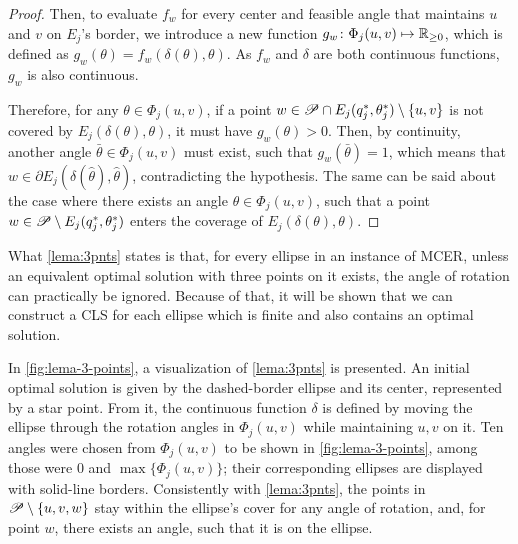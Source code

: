 \begin{proof}
	Then, to evaluate $f_w$ for every center and feasible angle that maintains $u$ and $v$ on $E_j$'s border, we introduce a new function $g_w\colon \Phi_j(u,v) \mapsto \mathbb{R}_{\ge0}$, which is defined as $g_w(\theta) = f_w(\delta(\theta), \theta)$.
	As $f_w$ and $\delta$ are both continuous functions, $g_w$ is also continuous.
	
	Therefore, for any $\theta\in\Phi_j(u,v)$, if a point $w \in \mathscr{P} \cap E_j(q_j^*, \theta_j^*)\setminus\{u,v\}$ is not covered by $E_j(\delta(\theta), \theta)$, it must have $g_w(\theta)>0$. Then, by continuity, another angle $\bar{\theta} \in \Phi_j(u,v)$ must exist, such that $g_w(\bar{\theta})=1$, which means that $w\in \partial E_j(\delta(\hat{\theta}), \hat{\theta})$, contradicting the hypothesis. The same can be said about the case where there exists an angle $\theta \in \Phi_j(u,v)$, such that a point $w \in \mathscr{P} \setminus E_j(q_j^*, \theta_j^*)$ enters the coverage of $E_j(\delta(\theta), \theta)$.
\end{proof}


What \autoref{lema:3pnts} states is that, for every ellipse in an instance of MCER, unless an equivalent optimal solution with three points on it exists, the angle of rotation can practically be ignored. Because of that, it will be shown that we can construct a CLS for each ellipse which is finite and also contains an optimal solution.

In \autoref{fig:lema-3-points}, a visualization of \autoref{lema:3pnts} is presented.
An initial optimal solution is given by the dashed-border ellipse and its center, represented by a star point. From it, the continuous function $\delta$ is defined by moving the ellipse through the rotation angles in $\Phi_j(u,v)$ while maintaining $u, v$ on it. Ten angles were chosen from $\Phi_j(u,v)$ to be shown in \autoref{fig:lema-3-points}, among those were $0$ and $\max\{\Phi_j(u,v)\}$; their corresponding ellipses are displayed with solid-line borders.
Consistently with \autoref{lema:3pnts}, the points in $\mathscr{P} \setminus \{u, v, w\}$ stay within the ellipse's cover for any angle of rotation, and, for point $w$, there exists an angle, such that it is on the ellipse.  

